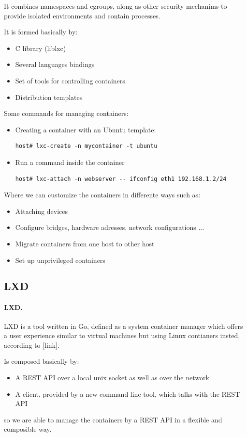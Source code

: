 It combines namespaces and cgroups, along as other security mechanims to provide isolated environments and contain processes.

It is formed basically by:
\begin{itemize}
	\item{C library (liblxc)}
	\item{Several languages bindings}
	\item{Set of tools for controlling containers}
	\item{Distribution templates}
\end{itemize}

Some commands for managing containers:
\begin{itemize}
	\item{Creating a container with an Ubuntu template}: 
	\begin{verbatim}
host# lxc-create -n mycontainer -t ubuntu
	\end{verbatim}
	\item{Run a command inside the container}
	\begin{verbatim}
host# lxc-attach -n webserver -- ifconfig eth1 192.168.1.2/24
	\end{verbatim}
\end{itemize}

Where we can customize the containers in differente ways such as:
\begin{itemize}
	\item{Attaching devices}
	\item{Configure bridges, hardware adresses, network configurations ...}
	\item{Migrate containers from one host to other host}
	\item{Set up unprivileged containers}
\end{itemize}

\subsection{LXD}
\paragraph{LXD.} LXD is a tool written in Go, defined as a system container manager which offers a user experience similar to virtual machines but using Linux contianers insted, according to [link].

Is composed basically by:
\begin{itemize}
	\item{A REST API over a local unix socket as well as over the network}
	\item{A client, provided by a new command line tool, which talks with the REST API}
\end{itemize}
so we are able to manage the containers by a REST API in a flexible and composible way.

